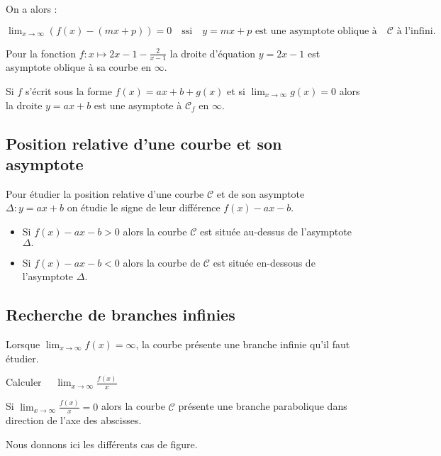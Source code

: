 On a alors :

\begin{definition}
$\displaystyle \lim_{x \to \infty}\left(f(x)-(mx+p)\right)=0 \quad\text{ssi}\quad y=mx+p \text{ est une asymptote oblique  à}\quad \mathcal{C}\text{ à l'infini}.$
\end{definition}
\begin{example}
Pour la fonction $f : x\mapsto 2x-1- \frac{2}{x-1} $
la droite d'équation   $y = 2x-1 $ est asymptote oblique à sa courbe en $ \infty $.

\end{example}

\begin{remark}
Si $ f $ s'écrit sous la forme $ f(x)= ax+b + g(x) $ et si $ \displaystyle\lim_{x \to \infty}g(x)=0 $  alors la droite $ y=ax+b $ est une asymptote à  $ \mathcal{C}_{f} $ en $ \infty. $
\end{remark}

\subsection{Position relative d'une courbe et son asymptote}
Pour étudier la position relative d'une courbe $\mathcal{C}$  et de son asymptote $\Delta : y=ax+b $  on étudie le signe de leur différence $ f(x)-ax-b$.
\begin{itemize}
\item Si $ f(x)-ax-b> 0$ alors la courbe  $ \mathcal{C} $ est  située  au-dessus de l'asymptote $ \Delta. $  
 
 \item Si $ f(x)-ax-b< 0$ alors la courbe de $ \mathcal{C} $ est  située  en-dessous de l'asymptote $ \Delta. $ 
\end{itemize}

\subsection{Recherche de branches infinies}
Lorsque  $ \displaystyle \lim_{x \to \infty}f(x)=\infty  $, la courbe présente une branche infinie qu'il faut étudier.

Calculer $\quad  \displaystyle \lim_{x \to \infty}\frac{f(x)}{x}$

   Si $\lim_{x \to \infty}\frac{f(x)}{x}=0  $  alors la courbe $ \mathcal{C} $ présente une branche parabolique dans direction de l'axe des abscisses.

 Nous donnons ici les différents cas de figure.




